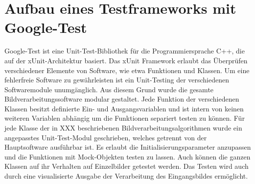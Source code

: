 %

\chapter{Aufbau eines Testframeworks mit Google-Test}
\label{cha:Aufbau eines Testframeworks mit Google-Test} 
%
%

Google-Test ist eine Unit-Test-Bibliothek f\"ur die Programmiersprache C++, die auf der xUnit-Architektur basiert. Das xUnit Framework erlaubt das \"Uberpr\"ufen verschiedener Elemente von Software, wie etwa Funktionen und Klassen. Um eine fehlerfreie Software zu gew\"ahrleisten ist ein Unit-Testing der verschiedenen Softwaremodule unumg\"anglich.
Aus diesem Grund wurde die gesamte Bildverarbeitungssoftware modular gestaltet. Jede Funktion der verschiedenen Klassen besitzt definierte Ein- und Ausgangsvariablen und ist intern von keinen weiteren Variablen abh\"angig um die Funktionen separiert testen zu k\"onnen.
F\"ur jede Klasse der in XXX beschriebenen Bildverarbeitungsalgorithmen wurde ein angepasstes Unit-Test-Modul geschrieben, welches getrennt von der Hauptsoftware ausf\"uhrbar ist. Es erlaubt die Initialisierungsparameter anzupassen und die Funktionen mit Mock-Objekten testen zu lassen. Auch k\"onnen die ganzen Klassen auf ihr Verhalten auf Einzelbilder getestet werden. Das Testen wird auch durch eine visualisierte Ausgabe der Verarbeitung des Eingangsbildes erm\"oglicht.










